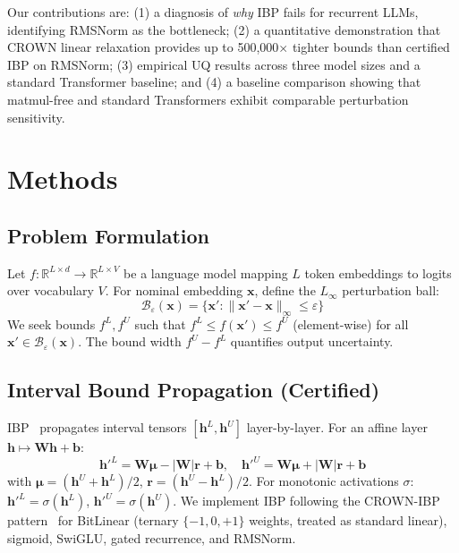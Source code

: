 \documentclass[11pt]{article}
\begin{document}
Our contributions are: (1) a diagnosis of \emph{why} IBP fails for recurrent LLMs, identifying RMSNorm as the bottleneck; (2) a quantitative demonstration that CROWN linear relaxation provides up to 500,000$\times$ tighter bounds than certified IBP on RMSNorm; (3) empirical UQ results across three model sizes and a standard Transformer baseline; and (4) a baseline comparison showing that matmul-free and standard Transformers exhibit comparable perturbation sensitivity.

\section{Methods}

\subsection{Problem Formulation}

Let $f: \mathbb{R}^{L \times d} \to \mathbb{R}^{L \times V}$ be a language model mapping $L$ token embeddings to logits over vocabulary $V$. For nominal embedding $\mathbf{x}$, define the $L_\infty$ perturbation ball:
\begin{equation}
\mathcal{B}_\varepsilon(\mathbf{x}) = \{\mathbf{x}' : \|\mathbf{x}' - \mathbf{x}\|_\infty \leq \varepsilon\}
\end{equation}
We seek bounds $f^L, f^U$ such that $f^L \leq f(\mathbf{x}') \leq f^U$ (element-wise) for all $\mathbf{x}' \in \mathcal{B}_\varepsilon(\mathbf{x})$. The bound width $f^U - f^L$ quantifies output uncertainty.

\subsection{Interval Bound Propagation (Certified)}

IBP~\cite{gowal2018effectiveness} propagates interval tensors $[\mathbf{h}^L, \mathbf{h}^U]$ layer-by-layer. For an affine layer $\mathbf{h} \mapsto \mathbf{W}\mathbf{h} + \mathbf{b}$:
\begin{equation}
\mathbf{h}'^L = \mathbf{W}\boldsymbol{\mu} - |\mathbf{W}|\mathbf{r} + \mathbf{b}, \quad
\mathbf{h}'^U = \mathbf{W}\boldsymbol{\mu} + |\mathbf{W}|\mathbf{r} + \mathbf{b}
\end{equation}
with $\boldsymbol{\mu} = (\mathbf{h}^U + \mathbf{h}^L)/2$, $\mathbf{r} = (\mathbf{h}^U - \mathbf{h}^L)/2$. For monotonic activations $\sigma$: $\mathbf{h}'^L = \sigma(\mathbf{h}^L)$, $\mathbf{h}'^U = \sigma(\mathbf{h}^U)$. We implement IBP following the CROWN-IBP pattern~\cite{zhang2019towards} for BitLinear (ternary $\{-1,0,+1\}$ weights, treated as standard linear), sigmoid, SwiGLU, gated recurrence, and RMSNorm.
\end{document}
